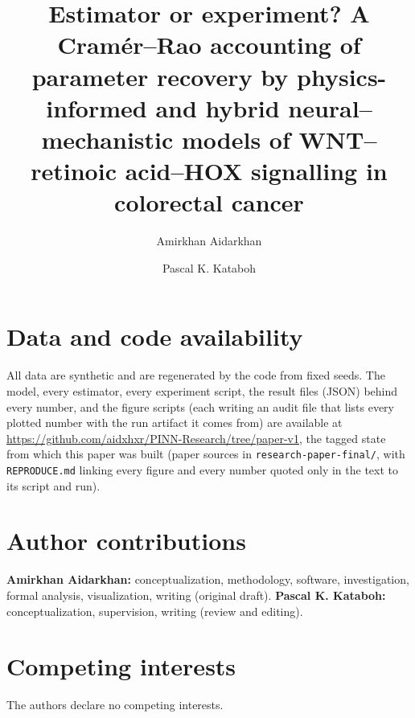 \documentclass[10.5pt]{article}
\title{\sffamily\bfseries Estimator or experiment? A Cram\'er--Rao accounting of
parameter recovery by physics-informed and hybrid neural--mechanistic models of
WNT--retinoic acid--HOX signalling in colorectal cancer}
\author[1]{Amirkhan Aidarkhan}
\author[1]{Pascal K. Kataboh}
\affil[1]{Department of Mathematics and Statistics, Swarthmore College,
Swarthmore, PA, USA}
\date{}
\begin{document}
\maketitle







\section*{Data and code availability}
All data are synthetic and are regenerated by the code from fixed seeds. The
model, every estimator, every experiment script, the result files (JSON) behind every
number, and the figure scripts (each writing an audit file that lists every
plotted number with the run artifact it comes from) are available at
\url{https://github.com/aidxhxr/PINN-Research/tree/paper-v1}, the tagged state
from which this paper was built (paper sources in \texttt{research-paper-final/},
with \texttt{REPRODUCE.md} linking every figure and every number quoted only in
the text to its script and run).

\section*{Author contributions}
\textbf{Amirkhan Aidarkhan:} conceptualization, methodology, software,
investigation, formal analysis, visualization, writing (original draft).
\textbf{Pascal K. Kataboh:} conceptualization, supervision, writing (review
and editing).

\section*{Competing interests}
The authors declare no competing interests.




\clearpage
\appendix
\renewcommand{\thefigure}{S\arabic{figure}}
\renewcommand{\thetable}{S\arabic{table}}
\setcounter{figure}{0}
\setcounter{table}{0}

\end{document}
